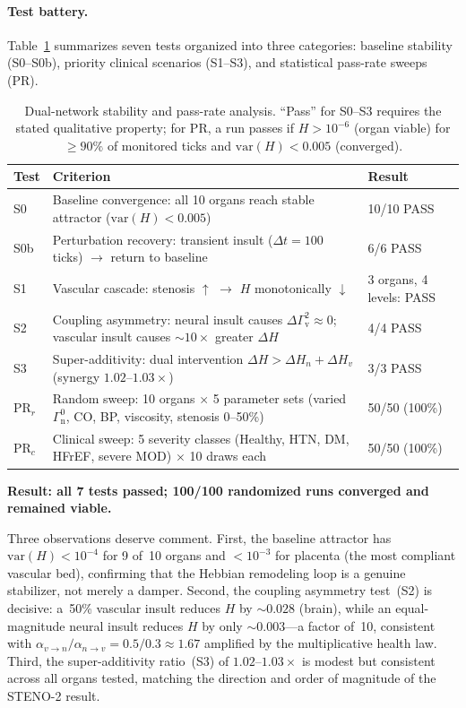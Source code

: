 ﻿\documentclass[aps,pre,twocolumn,superscriptaddress,floatfix]{revtex4-2}
\newcommand{\Gv}{\Gamma_{\mathrm{v}}}
\newcommand{\Gn}{\Gamma_{\mathrm{n}}}
\begin{document}
\paragraph{Test battery.}
Table~\ref{tab:stability} summarizes seven tests organized into
three categories: baseline stability (S0--S0b),
priority clinical scenarios (S1--S3), and statistical
pass-rate sweeps (PR).

\begin{table}[!htbp]
\caption{Dual-network stability and pass-rate analysis.
``Pass'' for S0--S3 requires the stated qualitative property;
for PR, a run passes if $H > 10^{-6}$ (organ viable) for
$\ge 90\%$ of monitored ticks and $\mathrm{var}(H) < 0.005$
(converged).}
\label{tab:stability}
\begin{ruledtabular}
\begin{tabular}{lp{4.8cm}l}
Test  & Criterion  & Result \\
\hline
S0  & Baseline convergence: all 10 organs reach stable
      attractor ($\mathrm{var}(H)<0.005$)
    & 10/10 PASS \\
S0b & Perturbation recovery: transient insult
      ($\Delta t=100$ ticks) $\to$ return to baseline
    & 6/6 PASS \\
S1  & Vascular cascade: stenosis $\uparrow$ $\to$
      $H$ monotonically $\downarrow$
    & 3 organs, 4 levels: PASS \\
S2  & Coupling asymmetry: neural insult causes
      $\Delta\Gv^2 \approx 0$; vascular insult causes
      $\sim\!10\times$ greater $\Delta H$
    & 4/4 PASS \\
S3  & Super-additivity: dual intervention
      $\Delta H > \Delta H_n + \Delta H_v$
      (synergy $1.02$--$1.03\times$)
    & 3/3 PASS \\
PR$_r$ & Random sweep: 10 organs $\times$ 5 parameter
         sets (varied $\Gn^0$, CO, BP, viscosity,
         stenosis 0--50\%)
       & 50/50 (100\%) \\
PR$_c$ & Clinical sweep: 5 severity classes
         (Healthy, HTN, DM, HFrEF, severe MOD)
         $\times$ 10 draws each
       & 50/50 (100\%) \\
\end{tabular}
\end{ruledtabular}
\end{table}

\textbf{Result: all 7 tests passed; 100/100 randomized
runs converged and remained viable.}

Three observations deserve comment.
First, the baseline attractor has $\mathrm{var}(H) < 10^{-4}$
for 9 of~10 organs and $< 10^{-3}$ for placenta (the most
compliant vascular bed), confirming that the Hebbian
remodeling loop is a genuine stabilizer, not merely a damper.
Second, the coupling asymmetry test~(S2) is decisive:
a~50\% vascular insult reduces $H$ by
$\sim\!0.028$ (brain), while an equal-magnitude neural insult
reduces $H$ by only $\sim\!0.003$---a factor of~10,
consistent with $\alpha_{v\to n}/\alpha_{n\to v}=0.5/0.3
\approx 1.67$ amplified by the multiplicative health law.
Third, the super-additivity ratio~(S3) of $1.02$--$1.03\times$
is modest but consistent across all organs tested, matching
the direction and order of magnitude of the STENO-2 result.
\end{document}
